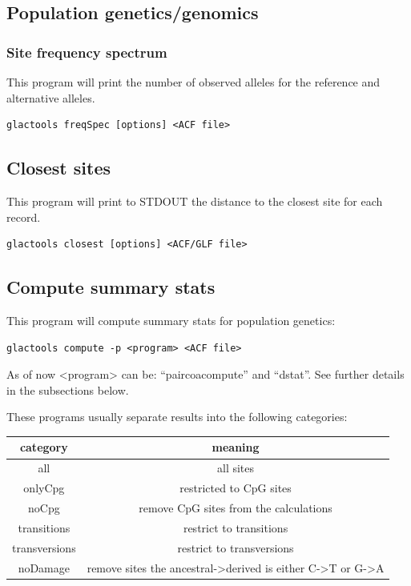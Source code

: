 \documentclass[a4paper]{article}
\begin{document}
\subsection{Population genetics/genomics}

\subsubsection{Site frequency spectrum}

This program will print the number of observed alleles for the reference and alternative alleles.

\begin{lstlisting}
glactools freqSpec [options] <ACF file>
\end{lstlisting}

\subsection{Closest sites}

\noindent This program will print to STDOUT the distance to the closest site for each record.

\begin{lstlisting}
glactools closest [options] <ACF/GLF file>
\end{lstlisting}






\subsection{Compute summary stats}

\noindent This program will compute summary stats for population genetics:

\begin{lstlisting}
glactools compute -p <program> <ACF file>
\end{lstlisting}

As of now <program> can be: ``paircoacompute'' and ``dstat''. See further details in the subsections below.

These programs usually separate results into the following categories:

\begin{tabular}{c|c}
{\bf category}  & {\bf meaning} \\
\hline
all            &  all sites \\
onlyCpg        & restricted to CpG sites \\
noCpg          & remove CpG sites from the calculations \\
transitions    & restrict to transitions \\
transversions  & restrict to transversions \\
noDamage       & remove sites the ancestral->derived is either C->T or G->A \\
\hline
\end{tabular}
\end{document}
